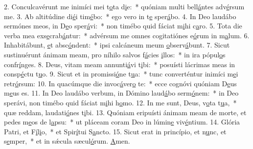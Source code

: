 2. Conculcavérunt me inimíci mei t\uline{o}ta d\uline{i}e:~* quóniam multi bell\uline{á}ntes adv\uline{é}rsum me.
3. Ab altitúdine di\uline{é}i tim\uline{é}bo:~* ego vero in t\uline{e} sper\uline{á}bo.
4. In Deo laudábo sermónes meos, in D\uline{e}o sper\uline{á}vi:~* non timébo quid fáciat m\uline{i}hi c\uline{a}ro.
5. Tota die verba mea exs\uline{e}crab\uline{á}ntur:~* advérsum me omnes cogitatiónes e\uline{ó}rum in m\uline{a}lum.
6. Inhabitábunt, \uline{e}t absc\uline{ó}ndent:~* ipsi calcáneum meum \uline{o}bserv\uline{á}bunt.
7. Sicut sustinuérunt ánimam meam, pro níhilo salvos f\uline{á}cies \uline{i}llos:~* in ira pópul\uline{o}s confr\uline{í}nges.
8. Deus, vitam meam annunti\uline{á}vi t\uline{i}bi:~* posuísti lácrimas meas in consp\uline{é}ctu t\uline{u}o.
9. Sicut et in promissi\uline{ó}ne t\uline{u}a:~* tunc converténtur inimíci m\uline{e}i retr\uline{ó}rsum:
10. In quacúmque die invoc\uline{á}ver\uline{o} te:~* ecce cognóvi quóniam D\uline{e}us m\uline{e}us es.
11. In Deo laudábo verbum, in Dómino laud\uline{á}bo serm\uline{ó}nem:~* in Deo sperávi, non timébo quid fáciat m\uline{i}hi h\uline{o}mo.
12. In me sunt, Deus, v\uline{o}ta t\uline{u}a,~* quæ reddam, laudati\uline{ó}nes t\uline{i}bi.
13. Quóniam eripuísti ánimam meam de morte, et pedes m\uline{e}os de l\uline{a}psu:~* ut pláceam coram Deo in lúmin\uline{e} viv\uline{é}ntium.
14. Glória Patri, et F\uline{í}l\uline{i}o,~* et Spir\uline{í}tui S\uline{a}ncto.
15. Sicut erat in princípio, et n\uline{u}nc, et s\uline{e}mper,~* et in sǽcula sæcul\uline{ó}rum. \uline{A}men.
